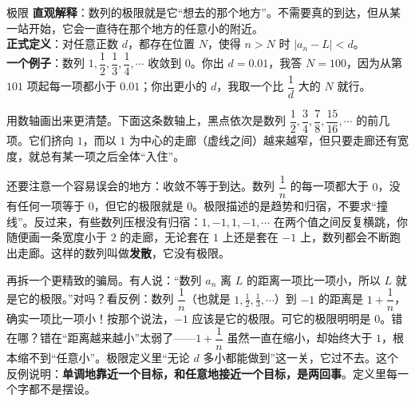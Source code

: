 \begin{shuyu}{极限}
\textbf{直观解释}：数列的极限就是它“想去的那个地方”。不需要真的到达，但从某一站开始，它会一直待在那个地方的任意小的附近。\\
\textbf{正式定义}：对任意正数 $d$，都存在位置 $N$，使得 $n>N$ 时 $|a_n-L|<d$。\\
\textbf{一个例子}：数列 $1,\dfrac{1}{2},\dfrac{1}{3},\dfrac{1}{4},\cdots$ 收敛到 $0$。你出 $d=0.01$，我答 $N=100$，因为从第 $101$ 项起每一项都小于 $0.01$；你出更小的 $d$，我取一个比 $\dfrac{1}{d}$ 大的 $N$ 就行。
\end{shuyu}

用数轴画出来更清楚。下面这条数轴上，黑点依次是数列 $\dfrac{1}{2},\dfrac{3}{4},\dfrac{7}{8},\dfrac{15}{16},\cdots$ 的前几项。它们挤向 $1$，而以 $1$ 为中心的走廊（虚线之间）越来越窄，但只要走廊还有宽度，就总有某一项之后全体“入住”。

\begin{center}
\end{center}

还要注意一个容易误会的地方：收敛不等于到达。数列 $\dfrac{1}{n}$ 的每一项都大于 $0$，没有任何一项等于 $0$，但它的极限就是 $0$。极限描述的是趋势和归宿，不要求“撞线”。反过来，有些数列压根没有归宿：$1,-1,1,-1,\cdots$ 在两个值之间反复横跳，你随便画一条宽度小于 $2$ 的走廊，无论套在 $1$ 上还是套在 $-1$ 上，数列都会不断跑出走廊。这样的数列叫做\textbf{发散}，它没有极限。

\begin{fanli}
再拆一个更精致的骗局。有人说：“数列 $a_n$ 离 $L$ 的距离一项比一项小，所以 $L$ 就是它的极限。”对吗？看反例：数列 $\dfrac{1}{n}$（也就是 $1,\frac12,\frac13,\cdots$）到 $-1$ 的距离是 $1+\dfrac{1}{n}$，确实一项比一项小！按那个说法，$-1$ 应该是它的极限。可它的极限明明是 $0$。错在哪？错在“距离越来越小”太弱了——$1+\dfrac{1}{n}$ 虽然一直在缩小，却始终大于 $1$，根本缩不到“任意小”。极限定义里“无论 $d$ 多小都能做到”这一关，它过不去。这个反例说明：\textbf{单调地靠近一个目标，和任意地接近一个目标，是两回事}。定义里每一个字都不是摆设。
\end{fanli}

